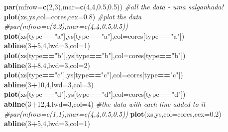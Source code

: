 \documentclass[
]{book}
\newenvironment{Shaded}{\begin{snugshade}}{\end{snugshade}}
\newcommand{\CommentTok}[1]{\textcolor[rgb]{0.56,0.35,0.01}{\textit{#1}}}
\newcommand{\DataTypeTok}[1]{\textcolor[rgb]{0.13,0.29,0.53}{#1}}
\newcommand{\DecValTok}[1]{\textcolor[rgb]{0.00,0.00,0.81}{#1}}
\newcommand{\FloatTok}[1]{\textcolor[rgb]{0.00,0.00,0.81}{#1}}
\newcommand{\KeywordTok}[1]{\textcolor[rgb]{0.13,0.29,0.53}{\textbf{#1}}}
\newcommand{\NormalTok}[1]{#1}
\newcommand{\OperatorTok}[1]{\textcolor[rgb]{0.81,0.36,0.00}{\textbf{#1}}}
\newcommand{\StringTok}[1]{\textcolor[rgb]{0.31,0.60,0.02}{#1}}
\begin{document}
\begin{Shaded}
\begin{Highlighting}[]
\KeywordTok{par}\NormalTok{(}\DataTypeTok{mfrow=}\KeywordTok{c}\NormalTok{(}\DecValTok{2}\NormalTok{,}\DecValTok{3}\NormalTok{),}\DataTypeTok{mar=}\KeywordTok{c}\NormalTok{(}\DecValTok{4}\NormalTok{,}\DecValTok{4}\NormalTok{,}\FloatTok{0.5}\NormalTok{,}\FloatTok{0.5}\NormalTok{))}
\CommentTok{#all the data - uma salganhada!}
\KeywordTok{plot}\NormalTok{(xs,ys,}\DataTypeTok{col=}\NormalTok{cores,}\DataTypeTok{cex=}\FloatTok{0.8}\NormalTok{)}
\CommentTok{#plot the data}
\CommentTok{#par(mfrow=c(2,2),mar=c(4,4,0.5,0.5))}
\KeywordTok{plot}\NormalTok{(xs[type}\OperatorTok{==}\StringTok{"a"}\NormalTok{],ys[type}\OperatorTok{==}\StringTok{"a"}\NormalTok{],}\DataTypeTok{col=}\NormalTok{cores[type}\OperatorTok{==}\StringTok{"a"}\NormalTok{])}
\KeywordTok{abline}\NormalTok{(}\DecValTok{3}\OperatorTok{+}\DecValTok{5}\NormalTok{,}\DecValTok{4}\NormalTok{,}\DataTypeTok{lwd=}\DecValTok{3}\NormalTok{,}\DataTypeTok{col=}\DecValTok{1}\NormalTok{)}
\KeywordTok{plot}\NormalTok{(xs[type}\OperatorTok{==}\StringTok{"b"}\NormalTok{],ys[type}\OperatorTok{==}\StringTok{"b"}\NormalTok{],}\DataTypeTok{col=}\NormalTok{cores[type}\OperatorTok{==}\StringTok{"b"}\NormalTok{])}
\KeywordTok{abline}\NormalTok{(}\DecValTok{3}\OperatorTok{+}\DecValTok{8}\NormalTok{,}\DecValTok{4}\NormalTok{,}\DataTypeTok{lwd=}\DecValTok{3}\NormalTok{,}\DataTypeTok{col=}\DecValTok{2}\NormalTok{)}
\KeywordTok{plot}\NormalTok{(xs[type}\OperatorTok{==}\StringTok{"c"}\NormalTok{],ys[type}\OperatorTok{==}\StringTok{"c"}\NormalTok{],}\DataTypeTok{col=}\NormalTok{cores[type}\OperatorTok{==}\StringTok{"c"}\NormalTok{])}
\KeywordTok{abline}\NormalTok{(}\DecValTok{3}\OperatorTok{+}\DecValTok{10}\NormalTok{,}\DecValTok{4}\NormalTok{,}\DataTypeTok{lwd=}\DecValTok{3}\NormalTok{,}\DataTypeTok{col=}\DecValTok{3}\NormalTok{)}
\KeywordTok{plot}\NormalTok{(xs[type}\OperatorTok{==}\StringTok{"d"}\NormalTok{],ys[type}\OperatorTok{==}\StringTok{"d"}\NormalTok{],}\DataTypeTok{col=}\NormalTok{cores[type}\OperatorTok{==}\StringTok{"d"}\NormalTok{])}
\KeywordTok{abline}\NormalTok{(}\DecValTok{3}\OperatorTok{+}\DecValTok{12}\NormalTok{,}\DecValTok{4}\NormalTok{,}\DataTypeTok{lwd=}\DecValTok{3}\NormalTok{,}\DataTypeTok{col=}\DecValTok{4}\NormalTok{)}
\CommentTok{#the data with each line added to it}
\CommentTok{#par(mfrow=c(1,1),mar=c(4,4,0.5,0.5))}
\KeywordTok{plot}\NormalTok{(xs,ys,}\DataTypeTok{col=}\NormalTok{cores,}\DataTypeTok{cex=}\FloatTok{0.2}\NormalTok{)}
\KeywordTok{abline}\NormalTok{(}\DecValTok{3}\OperatorTok{+}\DecValTok{5}\NormalTok{,}\DecValTok{4}\NormalTok{,}\DataTypeTok{lwd=}\DecValTok{3}\NormalTok{,}\DataTypeTok{col=}\DecValTok{1}\NormalTok{)}

\end{Highlighting}
\end{Shaded}
\end{document}
